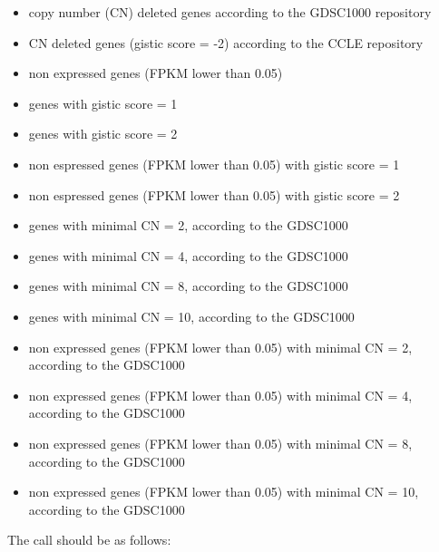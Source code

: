 \documentclass{article}\usepackage[]{graphicx}\usepackage[]{color}
\begin{document}
\begin{itemize}
        \item copy number (CN) deleted genes according to the GDSC1000 repository
        \item CN deleted genes (gistic score = -2) according to the CCLE repository
        \item non expressed genes (FPKM lower than 0.05)
        \item genes with gistic score = 1
        \item genes with gistic score = 2
        \item non espressed genes (FPKM lower than 0.05) with gistic score = 1
        \item non espressed genes (FPKM lower than 0.05) with gistic score = 2
        \item genes with minimal CN = 2, according to the GDSC1000
        \item genes with minimal CN = 4, according to the GDSC1000
        \item genes with minimal CN = 8, according to the GDSC1000
        \item genes with minimal CN = 10, according to the GDSC1000
        \item non expressed genes (FPKM lower than 0.05) with minimal CN = 2, according to the GDSC1000
        \item non expressed genes (FPKM lower than 0.05) with minimal CN = 4, according to the GDSC1000
        \item non expressed genes (FPKM lower than 0.05) with minimal CN = 8, according to the GDSC1000
        \item non expressed genes (FPKM lower than 0.05) with minimal CN = 10, according to the GDSC1000

        \end{itemize}

The call should be as follows:
\end{document}
